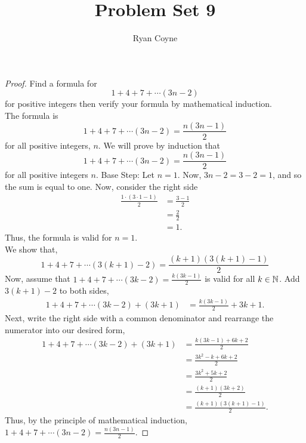 \documentclass[12pt]{article}
\begin{document}
    \title{Problem Set 9}
    \author{Ryan Coyne}
    \date{}
    \maketitle

    \noindent\begin{proof}{Find a formula for \begin{equation*}
        1+4+7+ \cdots (3n-2)
    \end{equation*}
    for positive integers then verify your formula by mathematical induction.\\
    The formula is \begin{equation*}
        1+4+7+ \cdots (3n-2) = \frac{n(3n-1)}{2}
    \end{equation*}
    for all positive integers, \(n\).}
    We will prove by induction that 
    \begin{equation*}
        1+4+7+ \cdots (3n-2) = \frac{n(3n-1)}{2}
    \end{equation*}
    for all positive integers \(n\). 
    Base Step: Let \(n=1\). Now, \(3n-2=3-2=1\), and so the sum is equal to one. Now, consider the right side \begin{equation*}
        \begin{split}
            \frac{1\cdot(3\cdot 1-1)}{2} &= \frac{3-1}{2}\\
            &=\frac{2}{2}\\
            &=1.
        \end{split}
    \end{equation*}
    Thus, the formula is valid for \(n=1\).\\
    We show that,
    \begin{equation*}
        1+4+7+ \cdots (3(k+1)-2) = \frac{(k+1)(3(k+1)-1)}{2}
    \end{equation*}
    Now, assume that \(1+4+7+ \cdots (3k-2) = \frac{k(3k-1)}{2}\) is valid for all \(k\in \mathbb{N}\). Add \(3(k+1)-2\) to both sides,
    \begin{equation*}
        \begin{split}
            1+4+7+ \cdots (3k-2) + (3k+1) &= \frac{k(3k-1)}{2} + 3k+1.
        \end{split}
    \end{equation*}
    Next, write the right side with a common denominator and rearrange the numerator into our desired form,
    \begin{equation*}
        \begin{split}
            1+4+7+ \cdots (3k-2) + (3k+1) &= \frac{k(3k-1)+ 6k+2}{2}\\
            &=\frac{3k^2-k + 6k+2}{2}\\
            &=\frac{3k^2+5k+2}{2}\\
            &=\frac{(k+1)(3k+2)}{2}\\
            &=\frac{(k+1)(3(k+1)-1)}{2}.
        \end{split}
    \end{equation*}
    Thus, by the principle of mathematical induction, \(1+4+7+ \cdots (3n-2) = \frac{n(3n-1)}{2}\).
    \end{proof}
\end{document}
